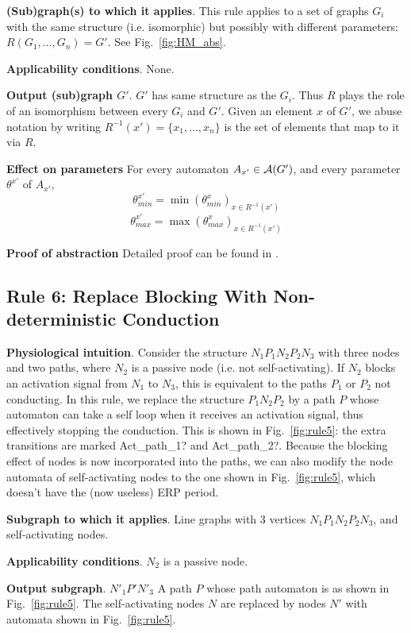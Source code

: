 \textbf{(Sub)graph(s) to which it applies}.
This rule applies to a set of graphs $G_i$ with the same structure (i.e. isomorphic) but possibly with different parameters: $R(G_1,\ldots,G_n) = G'$.
See Fig.~\ref{fig:HM_abs}.

\textbf{Applicability conditions}.
None.

\textbf{Output (sub)graph $G'$}.
$G'$ has same structure as the $G_i$.
Thus $R$ plays the role of an isomorphism between every $G_i$ and $G'$.
Given an element $x$ of $G'$, we abuse notation by writing $R^{-1}(x') = \{x_1,\dots,x_n\}$ is the set of elements that map to it via $R$.

\textbf{Effect on parameters}
For every automaton $A_{x'} \in \mathcal{A}(G')$, and every parameter $\theta^{x'}$ of $A_{x'}$, 
\[\theta_{min}^{x'} = \min(\theta^x_{min})_{x \in R^{-1}(x') }\]
\[\theta_{max}^{x'} = \max(\theta^x_{max})_{x \in R^{-1}(x') }\]

\textbf{Proof of abstraction} Detailed proof can be found in \cite{regar_tech}.

%

\subsection{Rule 6: Replace Blocking With Non-deterministic Conduction}
\textbf{Physiological intuition}. 
Consider the structure $N_1 P_1 N_2 P_2 N_3$ with three nodes and two paths, where $N_2$ is a passive node (i.e. not self-activating).
If $N_2$ blocks an activation signal from $N_1$ to $N_3$, this is equivalent to the paths $P_1$ or $P_2$ not conducting.
In this rule, we replace the structure $P_1 N_2 P_2$ by a path $P$ whose automaton can take a self loop when it receives an activation signal, thus effectively stopping the conduction. 
This is shown in Fig.~\ref{fig:rule5}: the extra transitions are marked {\quattrofont Act\_path\_1?} and {\quattrofont Act\_path\_2?}.
Because the blocking effect of nodes is now incorporated into the paths, we can also modify the node automata of self-activating nodes to the one shown in Fig.~\ref{fig:rule5}, which doesn't have the (now useless) ERP period.

\textbf{Subgraph to which it applies}.
Line graphs with 3 vertices $N_1 P_1 N_2 P_2 N_3$, and self-activating nodes.

\textbf{Applicability conditions}.
$N_2$ is a passive node.

\textbf{Output subgraph}.
$N'_1 P' N'_3$
A path $P$ whose path automaton is as shown in Fig.~\ref{fig:rule5}.
The self-activating nodes $N$ are replaced by nodes $N'$ with automata shown in Fig.~\ref{fig:rule5}.


